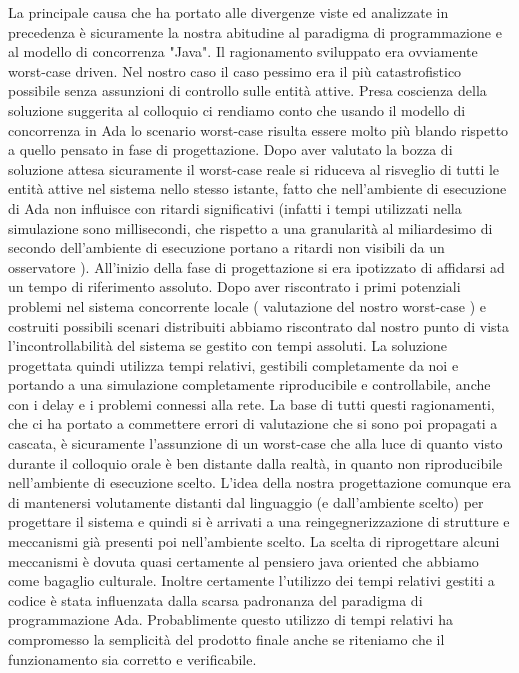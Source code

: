 \begin{itemize}
            La principale causa che ha portato alle divergenze viste ed analizzate in precedenza è sicuramente la nostra abitudine al paradigma di programmazione e al modello di concorrenza "Java". Il ragionamento sviluppato era ovviamente worst-case driven.  Nel nostro caso il caso pessimo era il più catastrofistico possibile senza assunzioni di controllo sulle entità attive. Presa coscienza della soluzione suggerita al colloquio ci rendiamo conto che usando il modello di concorrenza in Ada lo scenario worst-case risulta essere molto più blando rispetto a quello pensato in fase di progettazione. Dopo aver valutato la bozza di soluzione attesa sicuramente il worst-case reale si riduceva al risveglio di tutti le entità attive nel sistema nello stesso istante, fatto che nell'ambiente di esecuzione di Ada non influisce con ritardi significativi (infatti i tempi utilizzati nella simulazione sono millisecondi, che rispetto a una granularità al miliardesimo di secondo dell’ambiente di esecuzione portano a ritardi non visibili da un osservatore ). All'inizio della fase di progettazione si era ipotizzato di affidarsi ad un tempo di riferimento assoluto. Dopo aver riscontrato i primi potenziali problemi nel sistema concorrente locale ( valutazione del nostro worst-case ) e costruiti possibili scenari distribuiti abbiamo riscontrato dal nostro punto di vista l'incontrollabilità del sistema se gestito con tempi assoluti. La soluzione progettata quindi utilizza tempi relativi, gestibili completamente da noi e portando a una simulazione completamente riproducibile e controllabile, anche con i delay e i problemi connessi alla rete. La base di tutti questi ragionamenti, che ci ha portato a commettere errori di valutazione che si sono poi propagati a cascata, è sicuramente l'assunzione di un worst-case che alla luce di quanto visto durante il colloquio orale è ben distante dalla realtà, in quanto non riproducibile nell'ambiente di esecuzione scelto. L'idea della nostra progettazione comunque era di mantenersi volutamente distanti dal linguaggio (e dall'ambiente scelto) per progettare il sistema e quindi si è arrivati a una reingegnerizzazione di strutture e meccanismi già presenti poi nell'ambiente scelto. La scelta di riprogettare alcuni meccanismi è dovuta quasi certamente al pensiero java oriented che abbiamo come bagaglio culturale. Inoltre certamente l’utilizzo dei tempi relativi gestiti a codice è stata influenzata dalla scarsa padronanza del paradigma di programmazione Ada. Probablimente questo utilizzo di tempi relativi ha compromesso la semplicità del prodotto finale anche se riteniamo che il funzionamento sia corretto e verificabile.

\end{itemize}
